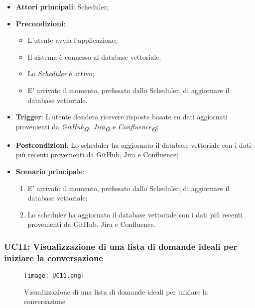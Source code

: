 \begin{itemize}
    \item \textbf{Attori principali}: Scheduler;
    \item \textbf{Precondizioni}: 
    \begin{itemize}
        \item L'utente avvia l'applicazione;
        \item Il sistema è connesso al database vettoriale;
        \item Lo \emph{Scheduler} è attivo;
        \item E' arrivato il momento, prefissato dallo Scheduler, di aggiornare il database vettoriale.
    \end{itemize}
    \item \textbf{Trigger}: L'utente desidera ricevere risposte basate su dati aggiornati provenienti da \emph{GitHub}\textsubscript{\textbf{\textit{G}}}, 
    \emph{Jira}\textsubscript{\textbf{\textit{G}}} e \emph{Confluence}\textsubscript{\textbf{\textit{G}}};
    \item \textbf{Postcondizioni}: Lo scheduler ha aggiornato il database vettoriale con i dati più recenti provenienti da GitHub, Jira e Confluence;
    \item \textbf{Scenario principale}:
    \begin{enumerate}
        \item E' arrivato il momento, prefissato dallo Scheduler, di aggiornare il database vettoriale;
        \item Lo scheduler ha aggiornato il database vettoriale con i dati più recenti provenienti da GitHub, Jira e Confluence.
    \end{enumerate}
\end{itemize}

\newpage

\hypertarget{UC11}{}
\subsubsection{UC11: Visualizzazione di una lista di domande ideali per iniziare la conversazione}

\begin{figure}[h]
    \centering
    \texttt{[image: UC11.png]}
    \caption{Visualizzazione di una lista di domande ideali per iniziare la conversazione}
\end{figure}

